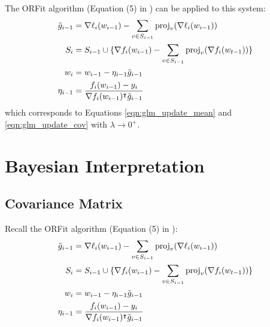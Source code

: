 The ORFit algorithm (Equation (5) in \cite{ORFit}) can be applied to this system:
\begin{align}
    \tilde{g}_{i-1} &= \nabla \ell_{i}(w_{i-1}) - \sum_{v \in S_{i-1}} \mathrm{proj}_{v}(\nabla \ell_i (w_{i-1})) \\
    S_i &= S_{i-1} \cup \{ \nabla f_i(w_{i-1}) - \sum_{v \in S_{i-1}} \mathrm{proj}_{v}(\nabla f_i(w_{t-1})) \} \\
    w_i &= w_{i-1} - \eta_{i-1} \tilde{g}_{i-1} \label{eqn:orfit_update} \\
    \eta_{i-1} &= \frac{f_i(w_{i-1}) - y_i}{\nabla f_i(w_{i-1})^{\intercal} \tilde{g}_{i-1}} \label{eqn:orfit_lr}
\end{align}
which corresponds to Equations \ref{eqn:glm_update_mean} and \ref{eqn:glm_update_cov} with $\lambda \rightarrow 0^{+}$.

\section{Bayesian Interpretation}
\subsection{Covariance Matrix}
Recall the ORFit algorithm (Equation (5) in \cite{ORFit}):
\begin{align}
    \tilde{g}_{i-1} &= \nabla \ell_{i}(w_{i-1}) - \sum_{v \in S_{i-1}} \mathrm{proj}_{v}(\nabla \ell_i (w_{i-1})) \\
    S_i &= S_{i-1} \cup \{ \nabla f_i(w_{i-1}) - \sum_{v \in S_{i-1}} \mathrm{proj}_{v}(\nabla f_i(w_{t-1})) \} \\
    w_i &= w_{i-1} - \eta_{i-1} \tilde{g}_{i-1} \label{eqn:orfit_update} \\
    \eta_{i-1} &= \frac{f_i(w_{i-1}) - y_i}{\nabla f_i(w_{i-1})^{\intercal} \tilde{g}_{i-1}} \label{eqn:orfit_lr}
\end{align}

